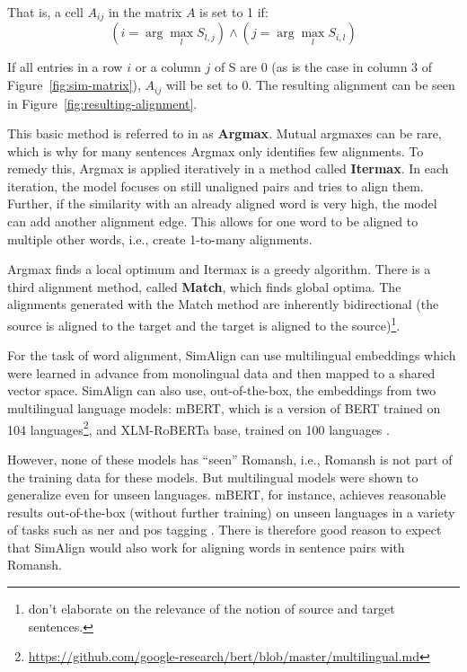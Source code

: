 That is, a cell $A_{ij}$ in the matrix $A$ is set to 1 if:
\[
	(i= \arg \max_l S_{l,j}) \land (j=\arg\max_l S_{i,l})
\]


If all entries in a row $i$ or a column $j$ of S are 0 (as is the case in column 3 of Figure~\ref{fig:sim-matrix}), $A_{ij}$ will be set to 0.
The resulting alignment can be seen in Figure~\ref{fig:resulting-alignment}.

This basic method is referred to in \cite{jalili-sabet-etal-2020-simalign} as \textbf{Argmax}. Mutual argmaxes can be rare, which is why for many sentences Argmax only identifies few alignments. 
To remedy this, Argmax is applied iteratively in a method called \textbf{Itermax}. 
In each iteration, the model focuses on still unaligned pairs and tries to align them. 
Further, if the similarity with an already aligned word is very high, the model can add another alignment edge. 
This allows for one word to be aligned to multiple other words, i.e., create 1-to-many alignments.

Argmax finds a local optimum and Itermax is a greedy algorithm. 
There is a third alignment method, called \textbf{Match}, which finds global optima. 
The alignments generated with the Match method are inherently bidirectional (the source is aligned to the target and the target is aligned to the source)\footnote{\cite{jalili-sabet-etal-2020-simalign} don't elaborate on the relevance  of the notion of source and target sentences.}.

For the task of word alignment, SimAlign can use multilingual embeddings which were learned in advance from monolingual data and then mapped to a shared vector space. 
SimAlign can also use, out-of-the-box, the embeddings from two multilingual language models: mBERT, which is a version of BERT \autocite{delvin-chang-2018-bert} trained on 104 languages\footnote{\url{https://github.com/google-research/bert/blob/master/multilingual.md}}, and XLM-RoBERTa base, trained on 100 languages \autocite{conneau-etal-2020-xlm}. 

However, none of these models has \enquote{seen} Romansh, i.e., Romansh is not part of the training data for these models. 
But multilingual models were shown to generalize even for unseen languages. 
mBERT, for instance, achieves reasonable results out-of-the-box (without further training) on unseen languages in a variety of tasks such as \acrfull{ner} and \acrfull{pos} tagging \autocite{pires-etal-2019-multilingual}. 
There is therefore good reason to expect that SimAlign would also work for aligning words in sentence pairs with Romansh.


